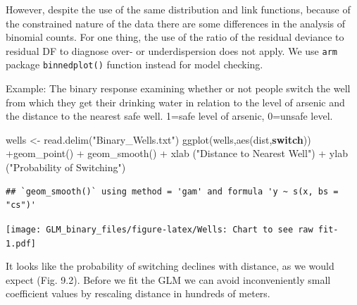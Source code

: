 \documentclass[
]{article}
\newenvironment{Shaded}{\begin{snugshade}}{\end{snugshade}}
\newcommand{\AttributeTok}[1]{\textcolor[rgb]{0.77,0.63,0.00}{#1}}
\newcommand{\ControlFlowTok}[1]{\textcolor[rgb]{0.13,0.29,0.53}{\textbf{#1}}}
\newcommand{\DecValTok}[1]{\textcolor[rgb]{0.00,0.00,0.81}{#1}}
\newcommand{\FloatTok}[1]{\textcolor[rgb]{0.00,0.00,0.81}{#1}}
\newcommand{\FunctionTok}[1]{\textcolor[rgb]{0.00,0.00,0.00}{#1}}
\newcommand{\NormalTok}[1]{#1}
\newcommand{\OtherTok}[1]{\textcolor[rgb]{0.56,0.35,0.01}{#1}}
\newcommand{\SpecialCharTok}[1]{\textcolor[rgb]{0.00,0.00,0.00}{#1}}
\newcommand{\StringTok}[1]{\textcolor[rgb]{0.31,0.60,0.02}{#1}}
\begin{document}
However, despite the use of the same distribution and link functions,
because of the constrained nature of the data there are some differences
in the analysis of binomial counts. For one thing, the use of the ratio
of the residual deviance to residual DF to diagnose over- or
underdispersion does not apply. We use \texttt{arm} package
\texttt{binnedplot()} function instead for model checking.

Example: The binary response examining whether or not people switch the
well from which they get their drinking water in relation to the level
of arsenic and the distance to the nearest safe well. 1=safe level of
arsenic, 0=unsafe level.

\begin{Shaded}
\begin{Highlighting}[]
\NormalTok{wells }\OtherTok{\textless{}{-}} \FunctionTok{read.delim}\NormalTok{(}\StringTok{"Binary\_Wells.txt"}\NormalTok{)}
\FunctionTok{ggplot}\NormalTok{(wells,}\FunctionTok{aes}\NormalTok{(dist,}\ControlFlowTok{switch}\NormalTok{)) }\SpecialCharTok{+}\FunctionTok{geom\_point}\NormalTok{() }\SpecialCharTok{+}
  \FunctionTok{geom\_smooth}\NormalTok{() }\SpecialCharTok{+}
  \FunctionTok{xlab}\NormalTok{ (}\StringTok{"Distance to Nearest Well"}\NormalTok{) }\SpecialCharTok{+}
  \FunctionTok{ylab}\NormalTok{ (}\StringTok{"Probability of Switching"}\NormalTok{)}
\end{Highlighting}
\end{Shaded}

\begin{verbatim}
## `geom_smooth()` using method = 'gam' and formula 'y ~ s(x, bs = "cs")'
\end{verbatim}

\texttt{[image: GLM\_binary\_files/figure-latex/Wells: Chart to see raw fit-1.pdf]}

It looks like the probability of switching declines with distance, as we
would expect (Fig. 9.2). Before we fit the GLM we can avoid
inconveniently small coefficient values by rescaling distance in
hundreds of meters.

\begin{Shaded}
\end{Shaded}
\end{document}
